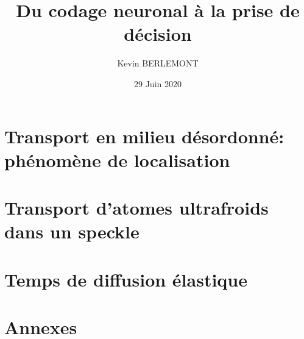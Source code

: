 \documentclass[a4paper, 11pt,twoside,openright]{book}
\title{Du codage neuronal \`a la prise de d\'ecision}
\author{Kevin BERLEMONT}
\institute{l'Ecole Normale Sup\'erieure}
\date{29 Juin 2020}
\begin{document}
{\hypersetup{linkcolor=black}
\tableofcontents}


\part{Transport en milieu désordonné: phénomène de localisation}

\stopcontents

\part{Transport d'atomes ultrafroids dans un speckle} 



\stopcontents

\part{Temps de diffusion élastique}


\stopcontents




\part{Annexes}
\appendix


\stopcontents

% 

 
\end{document}
